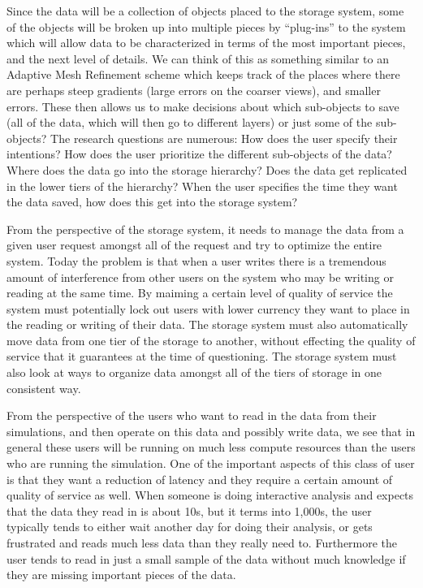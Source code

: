 Since the data will be a collection of objects placed to the storage system, some of the objects will be broken up into multiple pieces by ``plug-ins'' to the system
which will allow data to be characterized in terms of the most important pieces, and the next level of details. We can think of this as something similar to an Adaptive Mesh Refinement scheme
which keeps track of the places where there are perhaps steep gradients (large errors on the coarser views), and smaller errors.  These then allows us to make decisions about which 
sub-objects to save (all of the data, which will then go to different layers) or just some of the sub-objects?  The research questions are numerous: How does the user specify their intentions? 
How does the user prioritize the different sub-objects of the data? Where does the data go into the storage hierarchy? Does the data get replicated in the lower tiers of the hierarchy? 
When the user specifies the time they want the data saved, how does this get into the storage system?

From the perspective of the storage system, it needs to manage the data from a given user request amongst all of the request and try to optimize the entire system. Today the problem is that
when a user writes there is a tremendous amount of interference from other users on the system who may be writing or reading at the same time. By maiming a certain level of quality of service
the system must potentially lock out users with lower currency they want to place in the reading or writing of their data.  The storage system must also automatically move data from one tier of the
storage to another, without effecting the quality of service that it guarantees at the time of questioning. The storage system must also look at ways to organize data amongst all of the tiers of
storage in one consistent way. 

From the perspective of the users who want to read in the data from their simulations, and then operate on this data and possibly write data, we
see that in general these users will be running on much less compute resources than the users who are running the simulation. One of the
important aspects of this class of user is that they want a reduction of latency and they require a certain amount of quality of service as well. 
When someone is doing interactive analysis and expects that the data they read in is about 10s, but it terms into 1,000s, the user typically
tends to either wait another day for doing their analysis, or gets frustrated and reads much less data than they really need to. Furthermore
the user tends to read in just a small sample of the data without much knowledge if they are missing important pieces of the data. 

